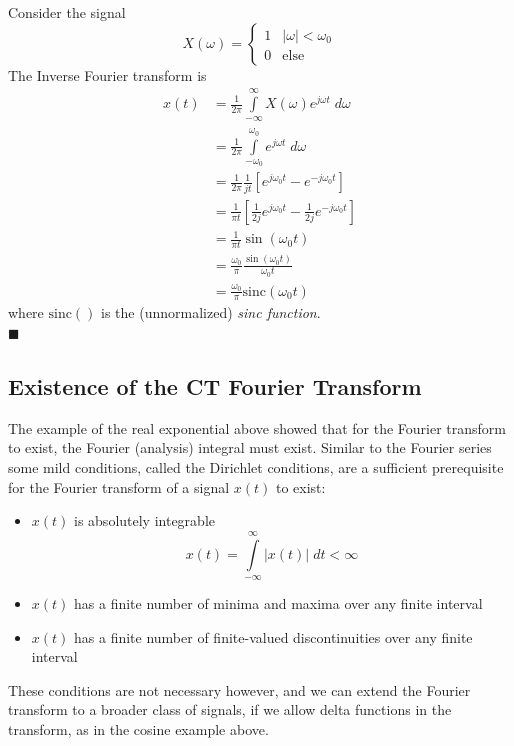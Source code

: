 \begin{example}
  Consider the signal
  \[
  X(\omega) = \begin{cases}
    1 & |\omega| < \omega_0\\
    0 & \text{else}
  \end{cases}
  \]
  The Inverse Fourier transform is
  \begin{align*}
    x(t) & = \frac{1}{2\pi} \int\limits_{-\infty}^{\infty} X(\omega)e^{j\omega t}\; d\omega\\
    &= \frac{1}{2\pi} \int\limits_{-\omega_0}^{\omega_0} e^{j\omega t}\; d\omega\\
    &= \frac{1}{2\pi} \frac{1}{jt} \left[ e^{j\omega_0 t} - e^{-j\omega_0 t}\right]\\
    &= \frac{1}{\pi t} \left[ \frac{1}{2j}e^{j\omega_0 t} - \frac{1}{2j} e^{-j\omega_0 t}\right]\\
    &= \frac{1}{\pi t} \sin(\omega_0 t)\\
    &= \frac{\omega_0}{\pi} \frac{\sin(\omega_0 t)}{\omega_0 t}\\
    &= \frac{\omega_0}{\pi} \mbox{sinc}(\omega_0 t)
  \end{align*}
  where $\mbox{sinc}()$ is the (unnormalized) \emph{sinc function}.\\
  $\blacksquare$
\end{example}

\subsection{Existence of the CT Fourier Transform}

The example of the real exponential above showed that for the Fourier transform to exist, the Fourier (analysis) integral must exist. Similar to the Fourier series some mild conditions, called the Dirichlet conditions, are a sufficient prerequisite for the Fourier transform of a signal $x(t)$ to exist:
\begin{itemize}
\item $x(t)$ is absolutely integrable
  \[
  x(t) = \int\limits_{-\infty}^{\infty} |x(t)|\; dt < \infty
  \]
\item $x(t)$ has a finite number of minima and maxima over any finite interval
\item $x(t)$ has a finite number of finite-valued discontinuities over any finite interval
\end{itemize}

These conditions are not necessary however, and we can extend the Fourier transform to a broader class of signals, if we allow delta functions in the transform, as in the cosine example above. 


